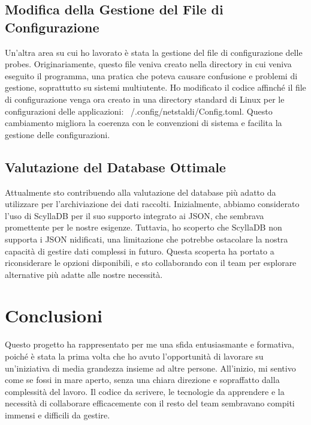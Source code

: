 \documentclass[target=bach,aauheader=,style=]{thud}
\begin{document}
\section{Modifica della Gestione del File di Configurazione}
Un'altra area su cui ho lavorato è stata la gestione del file di configurazione delle probes. Originariamente, questo file veniva creato nella directory in cui veniva eseguito il programma, una pratica che poteva causare confusione e problemi di gestione, soprattutto su sistemi multiutente. Ho modificato il codice affinché il file di configurazione venga ora creato in una directory standard di Linux per le configurazioni delle applicazioni: ~/.config/netstaldi/Config.toml. Questo cambiamento migliora la coerenza con le convenzioni di sistema e facilita la gestione delle configurazioni.

\section{Valutazione del Database Ottimale}
Attualmente sto contribuendo alla valutazione del database più adatto da utilizzare per l'archiviazione dei dati raccolti. Inizialmente, abbiamo considerato l'uso di ScyllaDB per il suo supporto integrato ai JSON, che sembrava promettente per le nostre esigenze. Tuttavia, ho scoperto che ScyllaDB non supporta i JSON nidificati, una limitazione che potrebbe ostacolare la nostra capacità di gestire dati complessi in futuro. Questa scoperta ha portato a riconsiderare le opzioni disponibili, e sto collaborando con il team per esplorare alternative più adatte alle nostre necessità.



\chapter{Conclusioni}
Questo progetto ha rappresentato per me una sfida entusiasmante e formativa, poiché è stata la prima volta che ho avuto l'opportunità di lavorare su un'iniziativa di media grandezza insieme ad altre persone. All'inizio, mi sentivo come se fossi in mare aperto, senza una chiara direzione e sopraffatto dalla complessità del lavoro. Il codice da scrivere, le tecnologie da apprendere e la necessità di collaborare efficacemente con il resto del team sembravano compiti immensi e difficili da gestire.
\end{document}
